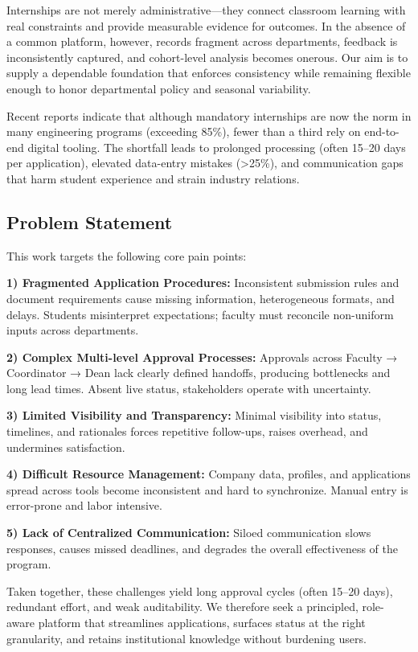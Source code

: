\documentclass[conference]{IEEEtran}
\begin{document}
Internships are not merely administrative—they connect classroom learning with real constraints and provide measurable evidence for outcomes. In the absence of a common platform, however, records fragment across departments, feedback is inconsistently captured, and cohort-level analysis becomes onerous. Our aim is to supply a dependable foundation that enforces consistency while remaining flexible enough to honor departmental policy and seasonal variability.

Recent reports indicate that although mandatory internships are now the norm in many engineering programs (exceeding 85\%), fewer than a third rely on end-to-end digital tooling. The shortfall leads to prolonged processing (often 15–20 days per application), elevated data-entry mistakes (>25\%), and communication gaps that harm student experience and strain industry relations.

\subsection{Problem Statement}
This work targets the following core pain points:

\textbf{1) Fragmented Application Procedures:} Inconsistent submission rules and document requirements cause missing information, heterogeneous formats, and delays. Students misinterpret expectations; faculty must reconcile non-uniform inputs across departments.

\textbf{2) Complex Multi-level Approval Processes:} Approvals across Faculty → Coordinator → Dean lack clearly defined handoffs, producing bottlenecks and long lead times. Absent live status, stakeholders operate with uncertainty.

\textbf{3) Limited Visibility and Transparency:} Minimal visibility into status, timelines, and rationales forces repetitive follow-ups, raises overhead, and undermines satisfaction.

\textbf{4) Difficult Resource Management:} Company data, profiles, and applications spread across tools become inconsistent and hard to synchronize. Manual entry is error-prone and labor intensive.

\textbf{5) Lack of Centralized Communication:} Siloed communication slows responses, causes missed deadlines, and degrades the overall effectiveness of the program.

Taken together, these challenges yield long approval cycles (often 15–20 days), redundant effort, and weak auditability. We therefore seek a principled, role-aware platform that streamlines applications, surfaces status at the right granularity, and retains institutional knowledge without burdening users.
\end{document}
